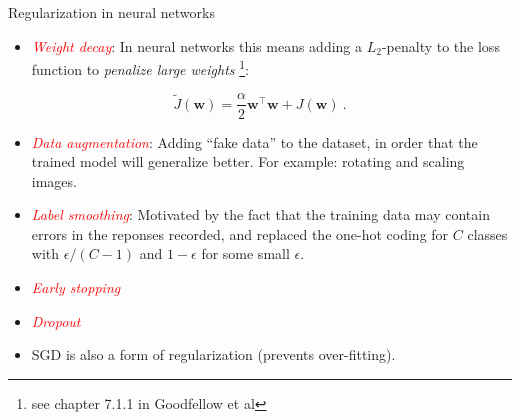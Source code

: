 \documentclass[
  10pt,
  ignorenonframetext,
]{beamer}
\providecommand{\tightlist}{%
  \setlength{\itemsep}{0pt}\setlength{\parskip}{0pt}}
\begin{document}
\begin{frame}
\begin{block}{Regularization in neural networks}
\protect\hypertarget{regularization-in-neural-networks}{}
\(~\)

\begin{itemize}
\tightlist
\item
  \emph{\textcolor{red}{Weight decay}}: In neural networks this means
  adding a \(L_2\)-penalty to the loss function to \emph{penalize large
  weights} \footnote{see chapter 7.1.1 in Goodfellow et al}:
\end{itemize}

\[ \tilde{J}({\boldsymbol w})= \frac{\alpha}{2}{{\boldsymbol w}^\top{\boldsymbol w}} + J({\boldsymbol w}) \ .\]

\vspace{2mm}

\begin{itemize}
\tightlist
\item
  \emph{\textcolor{red}{Data augmentation}}: Adding ``fake data'' to the
  dataset, in order that the trained model will generalize better. For
  example: rotating and scaling images.
\end{itemize}

\vspace{2mm}

\begin{itemize}
\tightlist
\item
  \emph{\textcolor{red}{Label smoothing}}: Motivated by the fact that
  the training data may contain errors in the reponses recorded, and
  replaced the one-hot coding for \(C\) classes with \(\epsilon/(C-1)\)
  and \(1-\epsilon\) for some small \(\epsilon\).
\end{itemize}

\vspace{2mm}

\begin{itemize}
\tightlist
\item
  \emph{\textcolor{red}{Early stopping}}
\end{itemize}

\vspace{2mm}

\begin{itemize}
\tightlist
\item
  \emph{\textcolor{red}{Dropout}}
\end{itemize}

\vspace{2mm}

\begin{itemize}
\tightlist
\item
  SGD is also a form of regularization (prevents over-fitting).
\end{itemize}
\end{block}
\end{frame}
\end{document}
